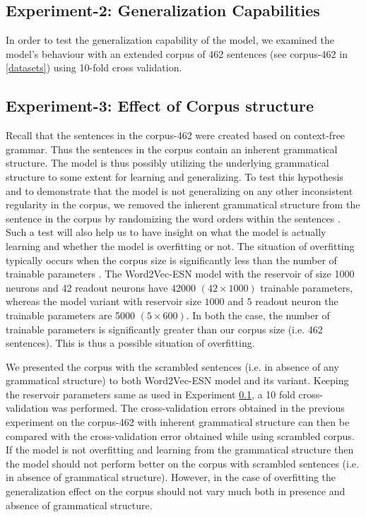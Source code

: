 \subsection{Experiment-2: Generalization Capabilities} \label{exp-2}

In order to test the generalization capability of the model, we examined the model's behaviour with an extended corpus of 462 sentences (see corpus-462 in \ref{datasets}) using 10-fold cross validation.

\subsection{Experiment-3: Effect of Corpus structure}

Recall that the sentences in the corpus-462 were created based on context-free grammar. Thus the sentences in the corpus contain an inherent grammatical structure. The model is thus possibly utilizing the underlying grammatical structure to some extent for learning and generalizing. To test this hypothesis and to demonstrate that the model is not generalizing on any other inconsistent regularity in the corpus, we removed the inherent grammatical structure from the sentence in the corpus by randomizing the word orders within the sentences \cite{xavier:2013:RT}. Such a test will also help us to have insight on what the model is actually learning and whether the model is overfitting or not. The situation of overfitting typically occurs when the corpus size is significantly less than the number of trainable parameters \cite{xavier:2013:RT}. The Word2Vec-ESN model with the reservoir of size 1000 neurons and 42 readout neurons have 42000 $(42 \times 1000)$ trainable parameters, whereas the model variant with reservoir size $1000$ and $5$ readout neuron the trainable parameters are 5000 $(5 \times 600)$. In both the case, the number of trainable parameters is significantly greater than our corpus size (i.e. 462 sentences). This is thus a possible situation of overfitting.

We presented the corpus with the scrambled sentences (i.e. in absence of any grammatical structure) to both Word2Vec-ESN model and its variant. Keeping the reservoir parameters same as used in Experiment \ref{exp-2}, a 10 fold cross-validation was performed. The cross-validation errors obtained in the previous experiment on the corpus-462 with inherent grammatical structure can then be compared with the cross-validation error obtained while using scrambled corpus. If the model is not overfitting and learning from the grammatical structure then the model should not perform better on the corpus with scrambled sentences (i.e. in absence of grammatical structure). However, in the case of overfitting the generalization effect on the corpus should not vary much both in presence and absence of grammatical structure. 

